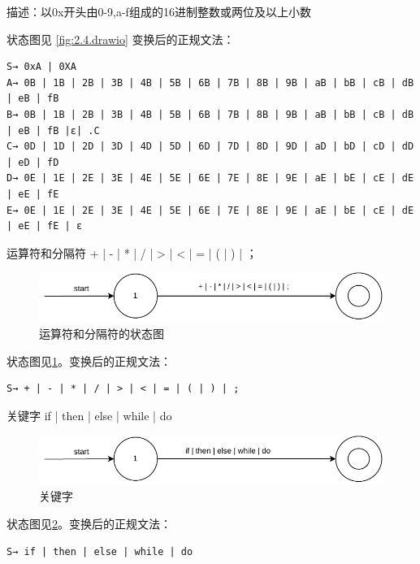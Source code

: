 \documentclass{ctexrep}
\begin{document}
\begin{outline}
描述：以0x开头由0-9,a-f组成的16进制整数或两位及以上小数

状态图见 \cref{fig:2.4.drawio} 变换后的正规文法：
\begin{verbatim}
S→ 0xA | 0XA
A→ 0B | 1B | 2B | 3B | 4B | 5B | 6B | 7B | 8B | 9B | aB | bB | cB | dB | eB | fB
B→ 0B | 1B | 2B | 3B | 4B | 5B | 6B | 7B | 8B | 9B | aB | bB | cB | dB | eB | fB |ε| .C 
C→ 0D | 1D | 2D | 3D | 4D | 5D | 6D | 7D | 8D | 9D | aD | bD | cD | dD | eD | fD  
D→ 0E | 1E | 2E | 3E | 4E | 5E | 6E | 7E | 8E | 9E | aE | bE | cE | dE | eE | fE   
E→ 0E | 1E | 2E | 3E | 4E | 5E | 6E | 7E | 8E | 9E | aE | bE | cE | dE | eE | fE | ε
\end{verbatim}

\2 运算符和分隔符	+ | - | * | / | > | < | = | ( | ) | ；


\begin{figure}[htp]
    \centering
    \includegraphics[width=0.8\linewidth]{2.6.drawio.pdf}
    \caption{运算符和分隔符的状态图}
    \label{fig:2.6.drawio}
\end{figure}

状态图见\cref{fig:2.6.drawio}。变换后的正规文法：

\begin{verbatim}
S→ + | - | * | / | > | < | = | ( | ) | ;
\end{verbatim}

\2 关键字			if | then | else | while | do  

\begin{figure}[htp]
    \centering
    \includegraphics[width=0.8\linewidth]{2.7.drawio.pdf}
    \caption{关键字}
    \label{fig:2.7.drawio}
\end{figure}

状态图见\cref{fig:2.7.drawio}。变换后的正规文法：

\begin{verbatim}
S→ if | then | else | while | do
\end{verbatim}


\end{outline}
\end{document}
